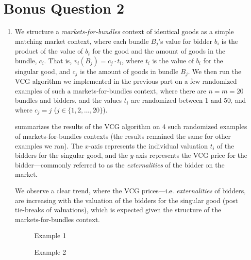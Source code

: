 \documentclass{article}
\begin{document}
\section{Bonus Question 2}

\begin{enumerate}[label=(\alph*)]

    \item We structure a \textit{markets-for-bundles} context of identical goods as a simple matching market context, where each bundle $B_j$'s value for bidder $b_i$ is the product of the value of $b_i$ for the good and the amount of goods in the bundle, $c_i$. That is, $v_{i}(B_j) = c_j \cdot t_i$, where $t_i$ is the value of $b_i$ for the singular good, and $c_j$ is the amount of goods in bundle $B_j$. We then run the VCG algorithm we implemented in the previous part on a few randomized examples of such a markets-for-bundles context, where there are $n = m = 20$ bundles and bidders, and the values $t_i$ are randomized between $1$ and $50$, and where $c_j = j$ ($j \in \{1, 2, \ldots, 20\}$).

     summarizes the results of the VCG algorithm on 4 such randomized examples of markets-for-bundles contexts (the results remained the same for other examples we ran). The $x$-axis represents the individual valuation $t_i$ of the bidders for the singular good, and the $y$-axis represents the VCG price for the bidder---commonly referred to as the \textit{externalities} of the bidder on the market. 
    
    We observe a clear trend, where the VCG prices---i.e. \textit{externalities} of bidders, are increasing with the valuation of the bidders for the singular good (post tie-breaks of valuations), which is expected given the structure of the markets-for-bundles context.

    \begin{figure*}[ht]
        \centering
        \begin{subfigure}{0.49\textwidth}
            \centering
            \resizebox{\textwidth}{!}{}
            \caption{Example 1}
        \end{subfigure}
        \hfill
        \begin{subfigure}{0.49\textwidth}
            \centering
            \resizebox{\textwidth}{!}{}
            \caption{Example 2}
        \end{subfigure}
        
        \vspace{1em} %
        

\end{figure*}
\end{enumerate}
\end{document}
